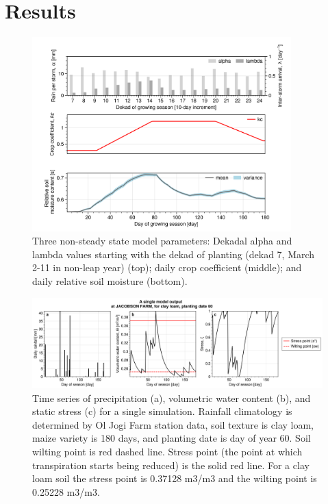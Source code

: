 \documentclass[draft]{agujournal2019}
\begin{document}
\section{Results}



\begin{figure}%
\centering
\includegraphics[width=100mm]{fig5_threefigs_dekadal.png}
\caption{Three non-steady state model parameters: Dekadal alpha and lambda values starting with the dekad of planting (dekad 7, March 2-11 in non-leap year) (top); daily crop coefficient (middle); and daily relative soil moisture (bottom).}
\label{fig:threefigs_dekadal}
\end{figure}

\begin{figure}%
\centering
\includegraphics[width=155mm]{fig6_ts.png}
\caption{Time series of precipitation (a), volumetric water content (b), and static stress (c) for a single simulation. Rainfall climatology is determined by Ol Jogi Farm station data, soil texture is clay loam, maize variety is 180 days, and planting date is day of year 60. Soil wilting point is red dashed line. Stress point (the point at which transpiration starts being reduced) is the solid red line. For a clay loam soil the stress point is 0.37128 m3/m3 and the wilting point is 0.25228 m3/m3.
}
\label{fig:fig1}
\end{figure}
\end{document}
